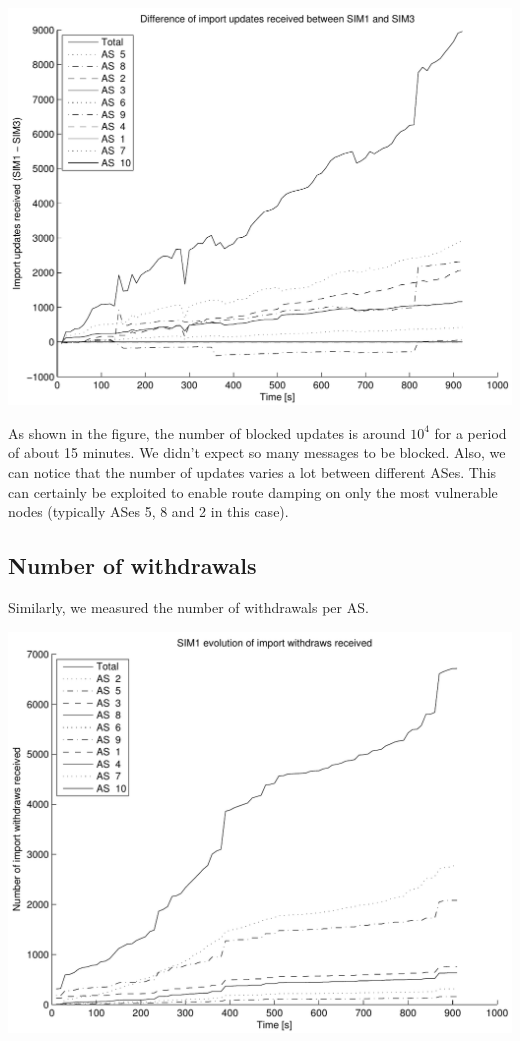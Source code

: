 \documentclass[a4paper,english]{IEEEtran}
\begin{document}
\begin{center}
\includegraphics[scale=.5]{img/diff_sim1_sim3.pdf}
\end{center}

As shown in the figure, the number of blocked updates is around $10^4$ for a period of about 15 minutes.
We didn't expect so many messages to be blocked.
Also, we can notice that the number of updates varies a lot between different ASes.
This can certainly be exploited to enable route damping on only the most vulnerable nodes (typically ASes 5, 8 and 2 in this case).

\subsection{Number of withdrawals}

Similarly, we measured the number of withdrawals per AS.

\begin{center}
\includegraphics[scale=.5]{img/SIM1_withdrawals.pdf}
\end{center}
\end{document}
